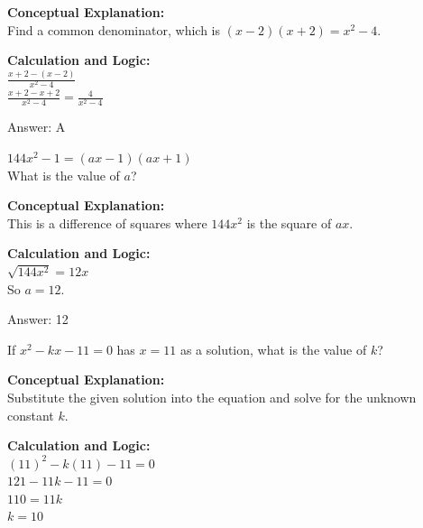 \documentclass[11pt,paper=a4,answers]{exam}
\begin{document}
\begin{questions}
\begin{solution}
\textbf{Conceptual Explanation:} \\
Find a common denominator, which is $(x - 2)(x + 2) = x^2 - 4$.

\vspace{20pt}

\textbf{Calculation and Logic:} \\
$\frac{x + 2 - (x - 2)}{x^2 - 4}$ \\
$\frac{x + 2 - x + 2}{x^2 - 4} = \frac{4}{x^2 - 4}$

\vspace{25pt}

Answer: \colorbox{yellow!100}{A}
\end{solution}

\vspace{40pt}

\question
$144x^2 - 1 = (ax - 1)(ax + 1)$ \\
What is the value of $a$?

\begin{solution}
\textbf{Conceptual Explanation:} \\
This is a difference of squares where $144x^2$ is the square of $ax$.

\vspace{20pt}

\textbf{Calculation and Logic:} \\
$\sqrt{144x^2} = 12x$ \\
So $a = 12$.

\vspace{25pt}

Answer: \colorbox{yellow!100}{12}
\end{solution}

\vspace{40pt}

\question
If $x^2 - kx - 11 = 0$ has $x = 11$ as a solution, what is the value of $k$?

\begin{solution}
\textbf{Conceptual Explanation:} \\
Substitute the given solution into the equation and solve for the unknown constant $k$.

\vspace{20pt}

\textbf{Calculation and Logic:} \\
$(11)^2 - k(11) - 11 = 0$ \\
$121 - 11k - 11 = 0$ \\
$110 = 11k$ \\
$k = 10$


\end{solution}
\end{questions}
\end{document}
